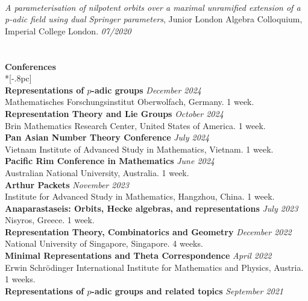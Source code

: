 \documentclass{article}
\begin{document}
\\
{\it A parameterisation of nilpotent orbits over a maximal unramified extension of a p-adic field using dual Springer parameters}, Junior London Algebra Colloquium, Imperial College London. \hfill {\it 07/2020\/} \\
\\
\\
{\large \bf Conferences} \\*[-.8pc]
\underline{\hspace{1.2in}} \\
{\bf Representations of $p$-adic groups} \hfill {\it December 2024 \/} \\
Mathematisches Forschungsinstitut Oberwolfach, Germany. 1 week.\\
{\bf Representation Theory and Lie Groups} \hfill {\it October 2024 \/} \\
Brin Mathematics Research Center, United States of America. 1 week.\\
{\bf Pan Asian Number Theory Conference} \hfill {\it July 2024 \/} \\
Vietnam Institute of Advanced Study in Mathematics, Vietnam. 1 week.\\
{\bf Pacific Rim Conference in Mathematics} \hfill {\it June 2024 \/} \\
Australian National University, Australia. 1 week.\\
{\bf Arthur Packets} \hfill {\it November 2023 \/} \\
Institute for Advanced Study in Mathematics, Hangzhou, China. 1 week.\\
{\bf Anaparastaseis: Orbits, Hecke algebras, and representations} \hfill {\it July 2023 \/} \\
Nisyros, Greece. 1 week.\\
{\bf Representation Theory, Combinatorics and Geometry} \hfill {\it December 2022 \/} \\
National University of Singapore, Singapore. 4 weeks.\\
{\bf Minimal Representations and Theta Correspondence} \hfill {\it April 2022 \/} \\
Erwin Schr{\"o}dinger International Institute for Mathematics and Physics, Austria. 1 weeks.\\
{\bf Representations of $p$-adic groups and related topics} \hfill {\it September 2021 \/} \\
\end{document}
